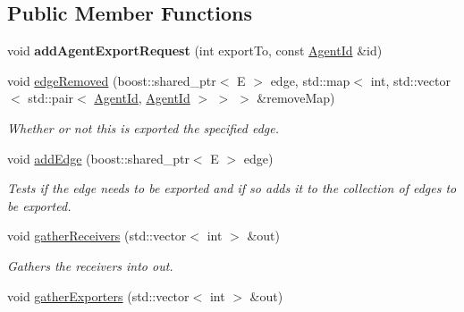 \subsection*{Public Member Functions}
\begin{DoxyCompactItemize}
\item 
\hypertarget{classrepast_1_1_edge_exporter_ae987c31a445fcbee65ec409ae6f4306c}{void {\bfseries add\-Agent\-Export\-Request} (int export\-To, const \hyperlink{classrepast_1_1_agent_id}{Agent\-Id} \&id)}\label{classrepast_1_1_edge_exporter_ae987c31a445fcbee65ec409ae6f4306c}

\item 
\hypertarget{classrepast_1_1_edge_exporter_a4d60a45bb6ea9de3ba989f7708fdedb8}{void \hyperlink{classrepast_1_1_edge_exporter_a4d60a45bb6ea9de3ba989f7708fdedb8}{edge\-Removed} (boost\-::shared\-\_\-ptr$<$ E $>$ edge, std\-::map$<$ int, std\-::vector$<$ std\-::pair$<$ \hyperlink{classrepast_1_1_agent_id}{Agent\-Id}, \hyperlink{classrepast_1_1_agent_id}{Agent\-Id} $>$ $>$ $>$ \&remove\-Map)}\label{classrepast_1_1_edge_exporter_a4d60a45bb6ea9de3ba989f7708fdedb8}

\begin{DoxyCompactList}\small\item\em Whether or not this is exported the specified edge. \end{DoxyCompactList}\item 
\hypertarget{classrepast_1_1_edge_exporter_a1799f762f412c81d2c60cc0337474e09}{void \hyperlink{classrepast_1_1_edge_exporter_a1799f762f412c81d2c60cc0337474e09}{add\-Edge} (boost\-::shared\-\_\-ptr$<$ E $>$ edge)}\label{classrepast_1_1_edge_exporter_a1799f762f412c81d2c60cc0337474e09}

\begin{DoxyCompactList}\small\item\em Tests if the edge needs to be exported and if so adds it to the collection of edges to be exported. \end{DoxyCompactList}\item 
void \hyperlink{classrepast_1_1_edge_exporter_ab748591b5dccdda31042a8ba989fd1a2}{gather\-Receivers} (std\-::vector$<$ int $>$ \&out)
\begin{DoxyCompactList}\small\item\em Gathers the receivers into out. \end{DoxyCompactList}\item 
\hypertarget{classrepast_1_1_edge_exporter_a14848eca966380f353a30792bc79fab9}{void \hyperlink{classrepast_1_1_edge_exporter_a14848eca966380f353a30792bc79fab9}{gather\-Exporters} (std\-::vector$<$ int $>$ \&out)}\label{classrepast_1_1_edge_exporter_a14848eca966380f353a30792bc79fab9}


\end{DoxyCompactItemize}
